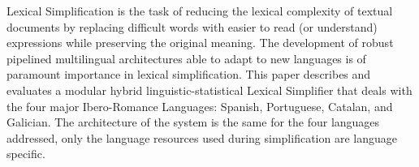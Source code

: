 Lexical Simplification is the task of reducing the lexical complexity of textual documents  by replacing difficult words with easier to read (or understand) expressions while preserving the original meaning. The development of robust pipelined multilingual architectures able to adapt to new languages is of paramount importance in lexical simplification.  This paper describes and evaluates a  modular hybrid linguistic-statistical Lexical Simplifier that deals with the four major Ibero-Romance Languages: Spanish, Portuguese, Catalan, and Galician. The architecture of the system is the same for the four languages addressed, only the language resources used during simplification are language specific.
